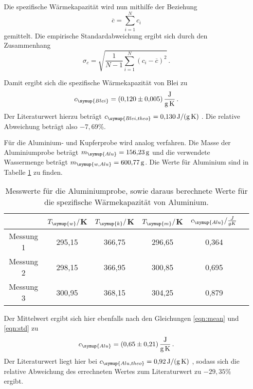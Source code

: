 Die spezifische Wärmekapazität wird nun mithilfe der Beziehung
\begin{equation}
  \overline{c} = \sum\limits_{i = 1}^N c_i
  \label{eqn:mean}
\end{equation}
gemittelt. Die empirische Standardabweichung ergibt sich durch den Zusammenhang
\begin{equation}
  \sigma_c = \sqrt{\frac{1}{N-1}
    \sum\limits_{i = 1}^N
    (c_i-\overline{c})^2} \,.
    \label{eqn:std}
\end{equation}

Damit ergibt sich die spezifische Wärmekapazität von Blei zu
\begin{equation}
  c_{\symup{Blei}} = \SI{0.120(0005)}{\joule\per\gram\per\kelvin} \,.\nonumber
\end{equation}
Der Literaturwert hierzu beträgt $c_{\symup{Blei,theo}}=\SI{0.130}{\joule\per\gram\per\kelvin}$ \cite{werte}.
Die relative Abweichung beträgt also $-7,69\%$.

Für die Aluminium- und Kupferprobe wird analog verfahren. Die Masse der Aluminiumprobe
beträgt $m_{\symup{Alu}}=\SI{156.23}{\gram}$ und die verwendete Wassermenge
beträgt $m_{\symup{w,Alu}}=\SI{600.77}{\gram}$. Die Werte für Aluminium sind in
Tabelle \ref{tab:alu} zu finden.

\begin{table}
  \centering
  \caption{Messwerte für die Aluminiumprobe, sowie daraus berechnete Werte für die spezifische
  Wärmekapazität von Aluminium.}
  \label{tab:alu}
  \begin{tabular}{c c c c c c}
    \toprule
    & $T_{\symup{w}}/$K & $T_{\symup{k}}/$K & $T_{\symup{m}}/$K & $c_{\symup{Alu}}/\frac{J}{g K}$ \\
    \midrule
    Messung 1 & 295,15 & 366,75 & 296,65 & 0,364 \\
    Messung 2 & 298,15 & 366,95 & 300,85 & 0,695 \\
    Messung 3 & 300,95 & 368,15 & 304,25 & 0,879 \\
    \bottomrule
  \end{tabular}
\end{table}

Der Mittelwert ergibt sich hier ebenfalls nach den Gleichungen \eqref{eqn:mean} und
\eqref{eqn:std} zu
\begin{equation}
  c_{\symup{Alu}} = \SI{0.65(021)}{\joule\per\gram\per\kelvin} \,.\nonumber
\end{equation}
Der Literaturwert liegt hier bei $c_{\symup{Alu,theo}}=\SI{0.92}{\joule\per\gram\per\kelvin}$ \cite{werte},
sodass sich die relative Abweichung des errechneten Wertes zum Literaturwert zu
$-29,35\%$ ergibt.


